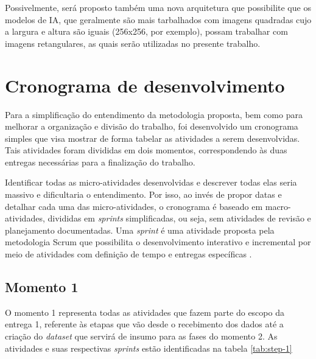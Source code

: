 Possivelmente, será proposto também uma nova arquitetura que possibilite que os modelos de IA, que geralmente são mais tarbalhados com imagens quadradas cujo a largura e altura são iguais (256x256, por exemplo), possam trabalhar com imagens retangulares, as quais serão utilizadas no presente trabalho.



\section{Cronograma de desenvolvimento}

Para a simplificação do entendimento da metodologia proposta, bem como para melhorar a organização e divisão do trabalho, foi desenvolvido um cronograma simples que visa mostrar de forma tabelar as atividades a serem desenvolvidas. Tais atividades foram divididas em dois momentos, correspondendo às duas entregas necessárias para a finalização do trabalho.

Identificar todas as micro-atividades desenvolvidas e descrever todas elas seria massivo e dificultaria o entendimento. Por isso, ao invés de propor datas e detalhar cada uma das micro-atividades, o cronograma é baseado em macro-atividades, divididas em \textit{sprints} simplificadas, ou seja, sem atividades de revisão e planejamento documentadas. Uma \textit{sprint} é uma atividade proposta pela metodologia Scrum que possibilita o desenvolvimento interativo e incremental por meio de atividades com definição de tempo e entregas específicas \cite{scrum}.

\subsection{Momento 1}

O momento 1 representa todas as atividades que fazem parte do escopo da entrega 1, referente às etapas que vão desde o recebimento dos dados até a criação do \textit{dataset} que servirá de insumo para as fases do momento 2. As atividades e suas respectivas \textit{sprints} estão identificadas na tabela \ref{tab:step-1}

